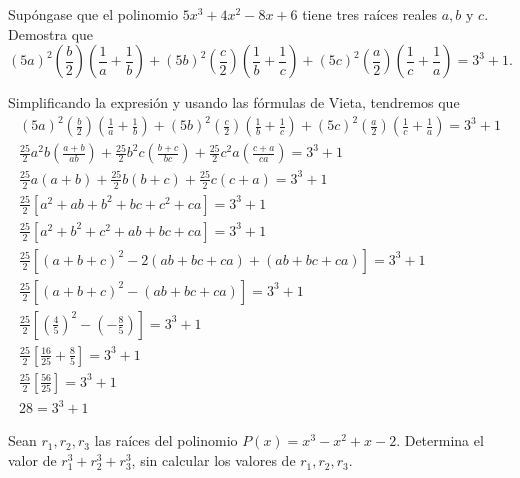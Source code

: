     \begin{section-problem}
        Supóngase que el polinomio $5x^3 + 4x^2 - 8x + 6$ tiene tres raíces reales $a, b \mbox{ y } c$.
        Demostra que \[(5a)^2\left(\frac{b}{2}\right)\left(\frac{1}{a} + \frac{1}{b}\right) + (5b)^2\left(\frac{c}{2}\right)\left(\frac{1}{b} + \frac{1}{c}\right)+ (5c)^2\left(\frac{a}{2}\right)\left(\frac{1}{c} + \frac{1}{a}\right) = 3^3 + 1.\]
    \end{section-problem}
    \begin{solution}
        Simplificando la expresión y usando las fórmulas de Vieta, tendremos que
        \begin{gather*}
        (5a)^2\left(\frac{b}{2}\right)\left(\frac{1}{a} + \frac{1}{b}\right) + (5b)^2\left(\frac{c}{2}\right)\left(\frac{1}{b} + \frac{1}{c}\right)+ (5c)^2\left(\frac{a}{2}\right)\left(\frac{1}{c} + \frac{1}{a}\right) = 3^3 + 1\\
        \frac{25}{2}a^2 b\left(\frac{a + b}{ab}\right) + \frac{25}{2} b^2 c\left(\frac{b + c}{bc}\right) + \frac{25}{2}c^2 a\left(\frac{c + a}{ca}\right) = 3^3 + 1\\
        \frac{25}{2}a\left(a + b\right) + \frac{25}{2}b\left(b + c \right) + \frac{25}{2}c\left(c + a\right) = 3^3 + 1\\
        \frac{25}{2}\left[ a^2 + ab + b^2 + bc + c^2 + ca \right] = 3^3 + 1\\
        \frac{25}{2}\left[ a^2 + b^2 + c^2 + ab + bc + ca \right] = 3^3 + 1\\
        \frac{25}{2}\left[ (a + b + c)^2 - 2(ab + bc + ca) + (ab + bc + ca)\right] = 3^3 + 1\\
        \frac{25}{2}\left[ (a + b + c)^2 - (ab + bc + ca)\right] = 3^3 + 1\\
        \frac{25}{2}\left[ \left(\frac{4}{5}\right)^2 - (-\frac{8}{5})\right] = 3^3 + 1\\
        \frac{25}{2}\left[ \frac{16}{25} + \frac{8}{5}\right] = 3^3 + 1\\
        \frac{25}{2}\left[ \frac{56}{25}\right] = 3^3 + 1\\
        28 = 3^3 + 1
        \end{gather*}
    \end{solution}

    \begin{section-problem}
        Sean $r_1, r_2, r_3$ las raíces del polinomio $P(x) = x^3 - x^2 + x - 2$.
        Determina el valor de $r^3_1 + r^3_2 + r^3_3$, sin calcular los valores de $r_1, r_2, r_3$.
    \end{section-problem}

